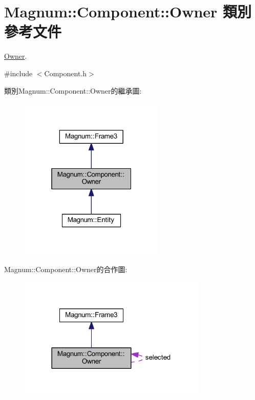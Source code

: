 \hypertarget{class_magnum_1_1_component_1_1_owner}{}\section{Magnum\+:\+:Component\+:\+:Owner 類別 參考文件}
\label{class_magnum_1_1_component_1_1_owner}


\hyperlink{class_magnum_1_1_component_1_1_owner}{Owner}.  




{\ttfamily \#include $<$Component.\+h$>$}



類別\+Magnum\+:\+:Component\+:\+:Owner的繼承圖\+:\nopagebreak
\begin{figure}[H]
\begin{center}
\leavevmode
\includegraphics[width=196pt]{class_magnum_1_1_component_1_1_owner__inherit__graph}
\end{center}
\end{figure}


Magnum\+:\+:Component\+:\+:Owner的合作圖\+:\nopagebreak
\begin{figure}[H]
\begin{center}
\leavevmode
\includegraphics[width=254pt]{class_magnum_1_1_component_1_1_owner__coll__graph}
\end{center}
\end{figure}

